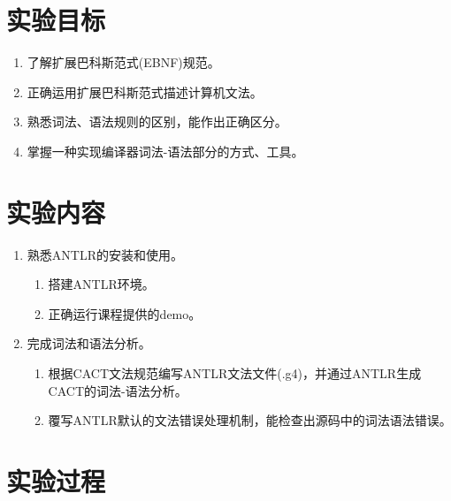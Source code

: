 \documentclass[UTF8]{report}
\begin{document}
\pagestyle{fancy}

\maketitle

\section{实验目标}

\begin{enumerate}
    \item 了解扩展巴科斯范式(EBNF)规范。
    \item 正确运用扩展巴科斯范式描述计算机文法。
    \item 熟悉词法、语法规则的区别，能作出正确区分。
    \item 掌握一种实现编译器词法-语法部分的方式、工具。
\end{enumerate}

\section{实验内容}

\begin{enumerate}
    \item 熟悉ANTLR的安装和使用。
    \begin{enumerate}
        \item 搭建ANTLR环境。
        \item 正确运行课程提供的demo。
    \end{enumerate}
    \item 完成词法和语法分析。
    \begin{enumerate}
        \item 根据CACT文法规范编写ANTLR文法文件(.g4)，并通过ANTLR生成CACT的词法-语法分析。
        \item 覆写ANTLR默认的文法错误处理机制，能检查出源码中的词法语法错误。
    \end{enumerate}
\end{enumerate}

\section{实验过程}
\end{document}
